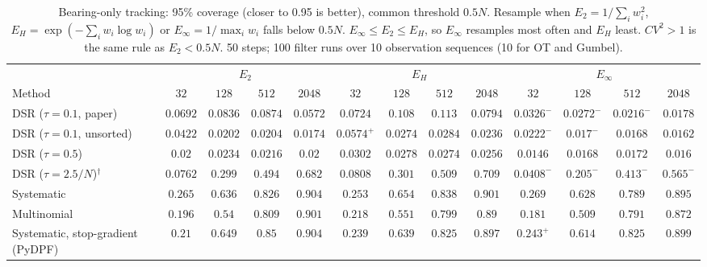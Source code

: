 \begin{table}[ht]
\centering
\small
\caption{Bearing-only tracking: 95\% coverage (closer to 0.95 is better), common threshold $0.5N$. Resample when $E_2=1/\sum_iw_i^2$, $E_H=\exp(-\sum_iw_i\log w_i)$ or $E_\infty=1/\max_iw_i$ falls below $0.5N$. $E_\infty\le E_2\le E_H$, so $E_\infty$ resamples most often and $E_H$ least. $CV^2>1$ is the same rule as $E_2<0.5N$. 50 steps; 100 filter runs over 10 observation sequences (10 for OT and Gumbel).}
\label{tab:trigger-fixed-bearing-coverage95}
\begin{adjustbox}{max width=\linewidth}
\begin{tabular}{lcccc|cccc|cccc}
\toprule
 & \multicolumn{4}{c}{$E_2$} & \multicolumn{4}{c}{$E_H$} & \multicolumn{4}{c}{$E_\infty$} \\
\cmidrule(lr){2-5} \cmidrule(lr){6-9} \cmidrule(lr){10-13}
Method & $32$ & $128$ & $512$ & $2048$ & $32$ & $128$ & $512$ & $2048$ & $32$ & $128$ & $512$ & $2048$ \\
\midrule
DSR ($\tau{=}0.1$, paper) & $0.0692$ & $0.0836$ & $0.0874$ & $0.0572$ & $\mathbf{0.0724}$ & $\mathbf{0.108}$ & $\mathbf{0.113}$ & $\mathbf{0.0794}$ & $0.0326^{-}$ & $0.0272^{-}$ & $0.0216^{-}$ & $0.0178$ \\
DSR ($\tau{=}0.1$, unsorted) & $0.0422$ & $0.0202$ & $0.0204$ & $0.0174$ & $\mathbf{0.0574}^{+}$ & $\mathbf{0.0274}$ & $\mathbf{0.0284}$ & $\mathbf{0.0236}$ & $0.0222^{-}$ & $0.017^{-}$ & $0.0168$ & $0.0162$ \\
DSR ($\tau{=}0.5$) & $0.02$ & $0.0234$ & $0.0216$ & $0.02$ & $\mathbf{0.0302}$ & $\mathbf{0.0278}$ & $\mathbf{0.0274}$ & $\mathbf{0.0256}$ & $0.0146$ & $0.0168$ & $0.0172$ & $0.016$ \\
DSR ($\tau{=}2.5/N$)$^\dagger$ & $0.0762$ & $0.299$ & $0.494$ & $0.682$ & $\mathbf{0.0808}$ & $\mathbf{0.301}$ & $\mathbf{0.509}$ & $\mathbf{0.709}$ & $0.0408^{-}$ & $0.205^{-}$ & $0.413^{-}$ & $0.565^{-}$ \\
\midrule
Systematic & $0.265$ & $0.636$ & $0.826$ & $\mathbf{0.904}$ & $0.253$ & $\mathbf{0.654}$ & $\mathbf{0.838}$ & $0.901$ & $\mathbf{0.269}$ & $0.628$ & $0.789$ & $0.895$ \\
Multinomial & $0.196$ & $0.54$ & $\mathbf{0.809}$ & $\mathbf{0.901}$ & $\mathbf{0.218}$ & $\mathbf{0.551}$ & $0.799$ & $0.89$ & $0.181$ & $0.509$ & $0.791$ & $0.872$ \\
Systematic, stop-gradient (PyDPF) & $0.21$ & $\mathbf{0.649}$ & $\mathbf{0.85}$ & $\mathbf{0.904}$ & $0.239$ & $0.639$ & $0.825$ & $0.897$ & $\mathbf{0.243}^{+}$ & $0.614$ & $0.825$ & $0.899$ \\

\end{tabular}
\end{adjustbox}
\end{table}
